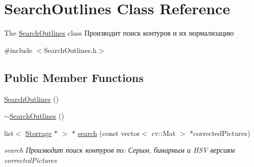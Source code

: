 \hypertarget{class_search_outlines}{\section{Search\+Outlines Class Reference}
\label{class_search_outlines}
}


The \hyperlink{class_search_outlines}{Search\+Outlines} class Производит поиск контуров и их нормализацию  




{\ttfamily \#include $<$Search\+Outlines.\+h$>$}

\subsection*{Public Member Functions}
\begin{DoxyCompactItemize}
\item 
\hyperlink{class_search_outlines_a3c7f09def73a9521a0735d8e90a79a94}{Search\+Outlines} ()
\item 
\hyperlink{class_search_outlines_ac75a5dc3628e9970b538b9636bec3599}{$\sim$\+Search\+Outlines} ()
\item 
list$<$ \hyperlink{class_storrage}{Storrage} $\ast$ $>$ $\ast$ \hyperlink{class_search_outlines_af38a752797a850533995230928187e32}{search} (const vector$<$ cv\+::\+Mat $>$ $\ast$corrected\+Pictures)
\begin{DoxyCompactList}\small\item\em search Производит поиск контуров по\+: Серым, бинарным и H\+S\+V версиям corrected\+Pictures \end{DoxyCompactList}\end{DoxyCompactItemize}
